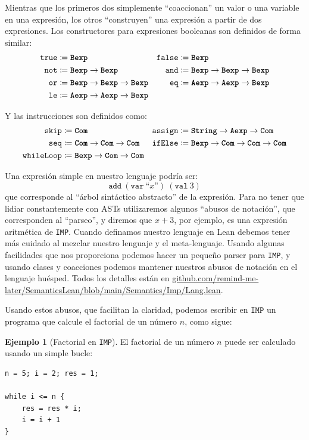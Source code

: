 \documentclass[
  a4paper, 
  10pt, 
  parskip=half, 
  toc=bibliography,
]{scrbook}
\theoremstyle{definition}
\theoremstyle{bolddef}
\newtheorem{example}[theorem]{Ejemplo}
\newcommand{\funfont}[1]{\texttt{#1}}
\newcommand{\tyfont}[1]{\texttt{\textbf{#1}}}
\newcommand{\ImpSkip}{\texttt{skip}}
\newcommand{\ImpName}{\texttt{IMP}}
\begin{document}
Mientras que los primeros dos simplemente \enquote{coaccionan} un valor o una
variable en una expresión, los otros \enquote{construyen} una expresión a partir de
dos expresiones. Los constructores para expresiones booleanas son definidos de
forma similar:
\begin{align*}
  \funfont{true}  &\coloneqq \tyfont{Bexp} &
  \funfont{false} &\coloneqq \tyfont{Bexp} \\
  \funfont{not}   &\coloneqq \tyfont{Bexp} \to \tyfont{Bexp} &
  \funfont{and}   &\coloneqq \tyfont{Bexp} \to \tyfont{Bexp} \to \tyfont{Bexp} \\
  \funfont{or}    &\coloneqq \tyfont{Bexp} \to \tyfont{Bexp} \to \tyfont{Bexp} &
  \funfont{eq}    &\coloneqq \tyfont{Aexp} \to \tyfont{Aexp} \to \tyfont{Bexp} \\
  \funfont{le}    &\coloneqq \tyfont{Aexp} \to \tyfont{Aexp} \to \tyfont{Bexp}
\end{align*}

Y las instrucciones son definidos como:
\begin{align*}
  \ImpSkip &\coloneqq \tyfont{Com} &
  \funfont{assign} &\coloneqq \tyfont{String} \to \tyfont{Aexp} \to \tyfont{Com} \\
  \funfont{seq} &\coloneqq \tyfont{Com} \to \tyfont{Com} \to \tyfont{Com} &
  \funfont{ifElse} &\coloneqq \tyfont{Bexp} \to \tyfont{Com} \to \tyfont{Com} \to \tyfont{Com} \\
  \funfont{whileLoop} &\coloneqq \tyfont{Bexp} \to \tyfont{Com} \to \tyfont{Com}
\end{align*}

Una expresión simple en nuestro lenguaje podría ser:
\[
  \funfont{add} \ (\funfont{var} \ \textit{``x''}) \ (\funfont{val} \ 3)
\]
que corresponde al \enquote{árbol sintáctico abstracto} de la expresión. Para
no tener que lidiar constantemente con ASTs utilizaremos algunos \enquote{abusos de
notación}, que corresponden al \enquote{parseo}, y diremos que \(x + 3\), por ejemplo, 
es una expresión aritmética de \ImpName.
Cuando definamos nuestro lenguaje en Lean debemos tener más cuidado al mezclar
nuestro lenguaje y el meta-lenguaje. Usando algunas facilidades que nos
proporciona podemos hacer un pequeño parser para \ImpName, y usando
clases y coacciones podemos mantener nuestros abusos de notación en el
lenguaje huésped. Todos los detalles están en \url{
github.com/remind-me-later/SemanticsLean/blob/main/Semantics/Imp/Lang.lean}.

Usando estos abusos, que facilitan la claridad, podemos escribir en \(\ImpName\)
un programa que calcule el factorial de un número \(n\), como sigue:
\begin{example}[Factorial en \ImpName]
  El factorial de un número \(n\) puede ser calculado usando un simple bucle:
\begin{verbatim}
n = 5; i = 2; res = 1;

while i <= n {
    res = res * i;
    i = i + 1
}
\end{verbatim}
\end{example}
\end{document}
